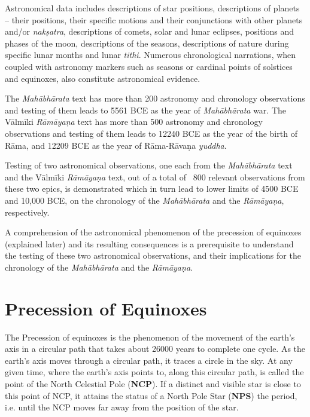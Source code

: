 Astronomical data includes descriptions of star positions, descriptions of planets – their positions, their specific motions and their conjunctions with other planets and/or \textit{nakṣatra}, descriptions of comets, solar and lunar eclipses, positions and phases of the moon, descriptions of the seasons, descriptions of nature during specific lunar months and lunar \textit{tithi}. Numerous chronological narrations, when coupled with astronomy markers such as seasons or cardinal points of solstices and equinoxes, also constitute astronomical evidence.

The \textit{Mahābhārata} text has more than 200 astronomy and chronology observations and testing of them leads to 5561 BCE as the year of \textit{Mahābhārata} war. The Vālmīki \textit{Rāmāyaṇa} text has more than 500 astronomy and chronology observations and testing of them leads to 12240 BCE as the year of the birth of Rāma, and 12209 BCE as the year of Rāma-Rāvaṇa \textit{yuddha}.

Testing of two astronomical observations, one each from the \textit{Mahābhārata} text and the Vālmīki \textit{Rāmāyaṇa} text, out of a total of ~800 relevant observations from these two epics, is demonstrated which in turn lead to lower limits of 4500 BCE and 10,000 BCE, on the chronology of the \textit{Mahābhārata} and the \textit{Rāmāyaṇa}, respectively.

A comprehension of the astronomical phenomenon of the precession of equinoxes (explained later) and its resulting consequences is a prerequisite to understand the testing of these two astronomical observations, and their implications for the chronology of the \textit{Mahābhārata} and the \textit{Rāmāyaṇa}.

\vspace{-.3cm}

\section*{Precession of Equinoxes}

The Precession of equinoxes is the phenomenon of the movement of the earth's axis in a circular path that takes about 26000 years to complete one cycle. As the earth’s axis moves through a circular path, it traces a circle in the sky. At any given time, where the earth's axis points to, along this circular path, is called the point of the North Celestial Pole (\textbf{NCP}). If a distinct and visible star is close to this point of NCP, it attains the status of a North Pole Star (\textbf{NPS}) the period, i.e. until the NCP moves far away from the position of the star.

